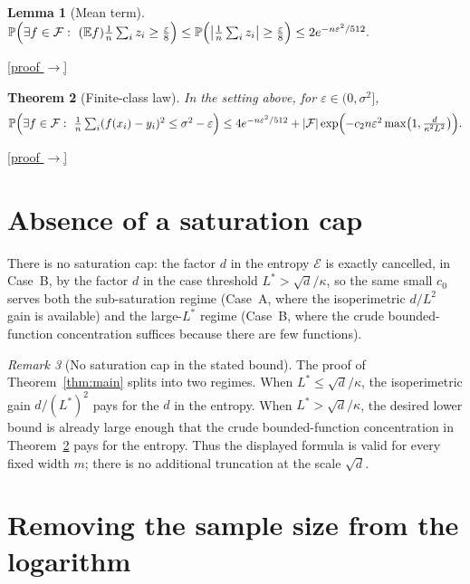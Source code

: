\documentclass[11pt,reqno]{amsart}
\theoremstyle{plain}
\newtheorem{theorem}{Theorem}[section]
\newtheorem{lemma}[theorem]{Lemma}
\theoremstyle{definition}
\theoremstyle{remark}
\newtheorem{remark}[theorem]{Remark}
\newcommand{\PP}{\mathbb{P}}
\newcommand{\EE}{\mathbb{E}}
\newcommand{\eps}{\varepsilon}
\newcommand{\FF}{\mathcal{F}}
\newcommand{\proofbutton}[1]{\hyperref[proof:#1]{\textnormal{\footnotesize\textsf{[proof $\to$]}}}}
\begin{document}
\begin{lemma}[Mean term]\label{lem:mean}
$\displaystyle\PP\Bigl(\exists f\in\FF:\ (\EE f)\tfrac1n\textstyle\sum_i z_i\ge\tfrac\eps8\Bigr)\le\PP\Bigl(\bigl|\tfrac1n\textstyle\sum_i z_i\bigr|\ge\tfrac\eps8\Bigr)\le2e^{-n\eps^2/512}.$
\end{lemma}
\proofbutton{mean}

\begin{theorem}[Finite-class law]\label{thm:finite}
In the setting above, for $\eps\in(0,\sigma^2]$,
\[
\PP\Bigl(\exists f\in\FF:\ \tfrac1n\textstyle\sum_i(f(x_i)-y_i)^2\le\sigma^2-\eps\Bigr)\le 4e^{-n\eps^2/512}+|\FF|\exp\Bigl(-c_2n\eps^2\max\bigl(1,\tfrac{d}{\kappa^2L^2}\bigr)\Bigr).
\]
\end{theorem}
\proofbutton{finite}

\section{Absence of a saturation cap}\label{sec:assembly}

There is no saturation cap: the factor $d$ in the entropy $\mathcal E$ is exactly cancelled, in Case~B, by the factor $d$ in the case threshold $L^\ast>\sqrt d/\kappa$, so the same small $c_0$ serves both the sub-saturation regime (Case~A, where the isoperimetric $d/L^2$ gain is available) and the large-$L^\ast$ regime (Case~B, where the crude bounded-function concentration suffices because there are few functions).


\begin{remark}[No saturation cap in the stated bound]\label{rem:under}
The proof of Theorem~\ref{thm:main} splits into two regimes. When $L^\ast\le\sqrt d/\kappa$, the isoperimetric gain $d/(L^\ast)^2$ pays for the $d$ in the entropy. When $L^\ast>\sqrt d/\kappa$, the desired lower bound is already large enough that the crude bounded-function concentration in Theorem~\ref{thm:finite} pays for the entropy. Thus the displayed formula is valid for every fixed width $m$; there is no additional truncation at the scale $\sqrt d$.
\end{remark}

\section{Removing the sample size from the logarithm}\label{sec:sharplog}
\end{document}
